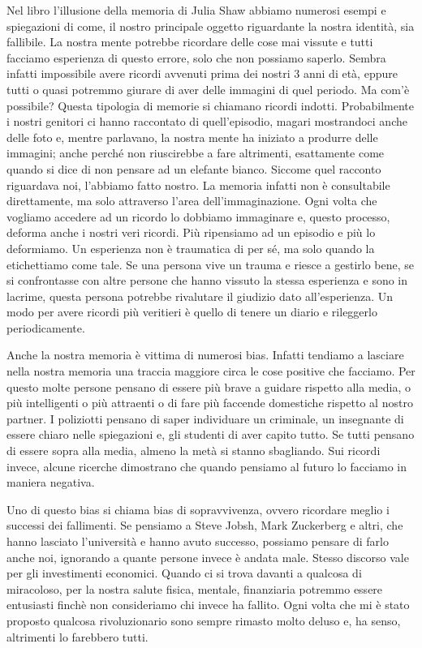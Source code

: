 \documentclass[12pt]{book} %
\begin{document}
\begin{mdframed}[linewidth=1pt]
Nel libro l'illusione della memoria di Julia Shaw abbiamo numerosi esempi
e spiegazioni di come, il nostro principale oggetto riguardante la nostra identità, sia fallibile. La nostra mente
potrebbe ricordare delle cose mai vissute e tutti facciamo esperienza di questo errore, solo che non possiamo saperlo.
Sembra infatti impossibile avere ricordi avvenuti prima dei nostri 3 anni di età, eppure tutti o quasi potremmo giurare
di aver delle immagini di quel periodo. Ma com'è possibile? Questa tipologia di memorie si
chiamano ricordi indotti. Probabilmente i nostri genitori ci hanno raccontato di quell'episodio,
magari mostrandoci anche delle foto e, mentre parlavano, la nostra mente ha iniziato a produrre delle immagini; anche
perché non riuscirebbe a fare altrimenti, esattamente come quando si dice di non pensare ad un elefante bianco. Siccome
quel racconto riguardava noi, l'abbiamo fatto nostro. La memoria infatti non è consultabile
direttamente, ma solo attraverso l'area dell'immaginazione. Ogni volta che
vogliamo accedere ad un ricordo lo dobbiamo immaginare e, questo processo, deforma anche i nostri veri ricordi. Più
ripensiamo ad un episodio e più lo deformiamo. Un esperienza non è traumatica di per sé, ma solo quando la etichettiamo
come tale. Se una persona vive un trauma e riesce a gestirlo bene, se si confrontasse con altre persone che hanno
vissuto la stessa esperienza e sono in lacrime, questa persona potrebbe rivalutare il giudizio dato all'esperienza. Un
modo per avere ricordi più veritieri è quello di tenere un diario e rileggerlo periodicamente.

Anche la nostra memoria è vittima di numerosi bias. Infatti tendiamo a lasciare nella nostra memoria una traccia
maggiore circa le cose positive che facciamo. Per questo molte persone pensano di essere più brave a guidare rispetto
alla media, o più intelligenti o più attraenti o di fare più faccende domestiche rispetto al nostro partner. I
poliziotti pensano di saper individuare un criminale, un insegnante di essere chiaro nelle spiegazioni e, gli studenti
di aver capito tutto. 
Se tutti pensano di essere sopra alla media, almeno la metà si stanno sbagliando.
Sui ricordi invece, alcune ricerche dimostrano che quando pensiamo al futuro lo facciamo in maniera negativa.

Uno di questo bias si chiama bias di sopravvivenza, ovvero ricordare meglio i successi dei fallimenti. Se pensiamo a
Steve Jobsh, Mark Zuckerberg e altri, che hanno lasciato l'università e hanno avuto successo, possiamo pensare di farlo
anche noi, ignorando a quante persone invece è andata male. Stesso discorso vale per gli investimenti economici. Quando
ci si trova davanti a qualcosa di miracoloso, per la nostra salute fisica, mentale, finanziaria potremmo essere
entusiasti finchè non consideriamo chi invece ha fallito. Ogni volta che mi è stato proposto qualcosa
rivoluzionario sono sempre rimasto molto deluso e, ha senso, altrimenti lo farebbero tutti.


\end{mdframed}
\end{document}
